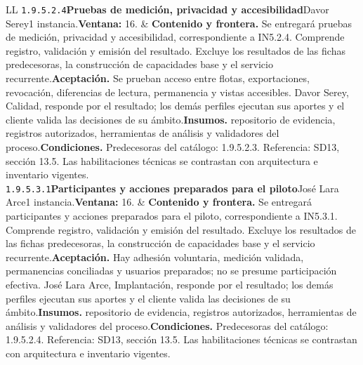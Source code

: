 \begin{longtable}{L{\tabcolsep\relax}L{\tabcolsep\relax}}
\texttt{1.\allowbreak{}9.\allowbreak{}5.\allowbreak{}2.\allowbreak{}4}\newline{}\textbf{Pruebas de medición, privacidad y accesibilidad}\newline{}Davor Serey\newline{}1 instancia.\newline{}\textbf{Ventana:} 16. & \textbf{Contenido y frontera.} Se entregará pruebas de medición, privacidad y accesibilidad, correspondiente a IN5.2.4. Comprende registro, validación y emisión del resultado. Excluye los resultados de las fichas predecesoras, la construcción de capacidades base y el servicio recurrente.\newline{}\textbf{Aceptación.} Se prueban acceso entre flotas, exportaciones, revocación, diferencias de lectura, permanencia y vistas accesibles. Davor Serey, Calidad, responde por el resultado; los demás perfiles ejecutan sus aportes y el cliente valida las decisiones de su ámbito.\newline{}\textbf{Insumos.} repositorio de evidencia, registros autorizados, herramientas de análisis y validadores del proceso.\newline{}\textbf{Condiciones.} Predecesoras del catálogo: 1.9.5.2.3. Referencia: SD13, sección 13.5. Las habilitaciones técnicas se contrastan con arquitectura e inventario vigentes.\\\hline
\texttt{1.\allowbreak{}9.\allowbreak{}5.\allowbreak{}3.\allowbreak{}1}\newline{}\textbf{Participantes y acciones preparados para el piloto}\newline{}José Lara Arce\newline{}1 instancia.\newline{}\textbf{Ventana:} 16. & \textbf{Contenido y frontera.} Se entregará participantes y acciones preparados para el piloto, correspondiente a IN5.3.1. Comprende registro, validación y emisión del resultado. Excluye los resultados de las fichas predecesoras, la construcción de capacidades base y el servicio recurrente.\newline{}\textbf{Aceptación.} Hay adhesión voluntaria, medición validada, permanencias conciliadas y usuarios preparados; no se presume participación efectiva. José Lara Arce, Implantación, responde por el resultado; los demás perfiles ejecutan sus aportes y el cliente valida las decisiones de su ámbito.\newline{}\textbf{Insumos.} repositorio de evidencia, registros autorizados, herramientas de análisis y validadores del proceso.\newline{}\textbf{Condiciones.} Predecesoras del catálogo: 1.9.5.2.4. Referencia: SD13, sección 13.5. Las habilitaciones técnicas se contrastan con arquitectura e inventario vigentes.\\\hline

\end{longtable}
